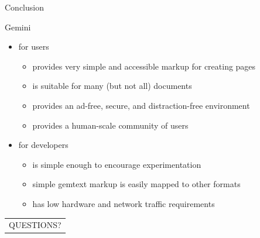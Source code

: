 \documentclass[presentation, 11pt,  aspectratio=169]{beamer}
\begin{document}
\begin{frame}[label={sec:orgf0e76b5}]{Conclusion}
\begin{block}{Gemini}
\begin{itemize}
\item \alert{for users}\\
\begin{itemize}
\item provides very simple and accessible markup for creating pages\\
\item is suitable for many (but not all) documents\\
\item provides an ad-free, secure, and distraction-free environment\\
\item provides a human-scale community of users\\
\end{itemize}

\item \alert{for developers}\\
\begin{itemize}
\item is simple enough to encourage experimentation\\
\item simple gemtext markup is easily mapped to other formats\\
\item has low hardware and network traffic requirements\\
\end{itemize}
\end{itemize}
\end{block}
\begin{block}{}
\begin{center}
\begin{tabular}{c}
QUESTIONS?\\
\end{tabular}
\end{center}
\end{block}
\end{frame}
\end{document}
